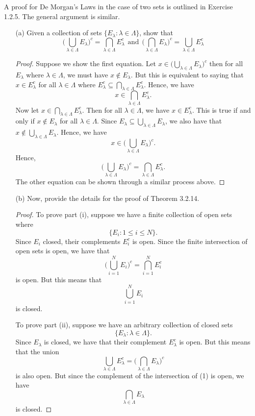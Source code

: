 A proof for De Morgan's Laws in the case of two sets is outlined in Exercise 1.2.5. The general argument is similar. 

\begin{enumerate}
    \item[(a)] Given a collection of sets \( \{ E_{\lambda} : \lambda \in \Lambda\}  \), show that \[ \Big( \bigcup_{ \lambda \in \Lambda } E_{\lambda}  \Big)^c = \bigcap_{ \lambda \in \Lambda } E_{\lambda}^c  ~~ \text{and} ~~ \Big( \bigcap_{ \lambda \in \Lambda } E_{\lambda}  \Big)^c = \bigcup_{ \lambda \in \Lambda } E_{\lambda}^c \]
        \begin{proof}
            Suppose we show the first equation. Let \( x \in \Big( \bigcup_{ \lambda \in \Lambda } E_{\lambda}  \Big)^c \) then for all \( E_{\lambda} \) where \( \lambda \in \Lambda \), we must have \( x \notin E_{\lambda} \). But this is equivalent to saying that \( x \in E_{\lambda}^c \) for all \( \lambda \in \Lambda \) where \( E_{\lambda}^c \subseteq \bigcap_{ \lambda \in \Lambda } E_{\lambda}^c  \). Hence, we have
            \[  x \in \bigcap_{ \lambda \in \Lambda } E_{\lambda}^c.\]
            Now let \( x \in \bigcap_{ \lambda \in \Lambda } E_{\lambda}^c  \). Then for all \( \lambda \in \Lambda \), we have \( x \in E_{\lambda}^c \). This is true if and only if \( x \notin E_{\lambda} \) for all \( \lambda \in \Lambda \). Since \( E_{\lambda} \subseteq \bigcup_{ \lambda \in \Lambda } E_{\lambda} \), we also have that \( x \notin \bigcup_{ \lambda \in \Lambda } E_{\lambda}  \). Hence, we have 
            \[  x \in \Big( \bigcup_{ \lambda \in \Lambda } E_{\lambda}  \Big)^c. \]
            Hence, 
            \[ \Big( \bigcup_{ \lambda \in \Lambda } E_{\lambda}  \Big)^c = \bigcap_{ \lambda \in \Lambda } E_{\lambda}^c.\]
            The other equation can be shown through a similar process above.
        \end{proof}
    \item[(b)] Now, provide the details for the proof of Theorem 3.2.14.
        \begin{proof} 
    To prove part (i), suppose we have a finite collection of open sets where 
    \[ \{ E_{i} : 1 \leq  i \leq N \}.   \]
    Since \( E_i  \) closed, their complements \( E_i^c \) is open. Since the finite intersection of open sets is open, we have that 
    \[\Big(  \bigcup_{ i=1 }^{ N } E_{i} \Big)^c = \bigcap_{ i=1 }^{ N  } E_{i}^c  \]
    is open. But this means that 
    \[ \bigcup_{i=1}^{N} E_{i} \]
    is closed. 

    To prove part (ii), suppose we have an arbitrary collection of closed sets 
    \[ \{ E_\lambda : \lambda \in \Lambda \}.  \]
    Since \(E_{\lambda}\) is closed, we have that their complement \( E_{\lambda}^c \) is open. But this means that the union 
    \[ \bigcup_{\lambda \in \Lambda} E_{\lambda}^c = \Big( \bigcap_{ \lambda \in \Lambda } E_{\lambda}  \Big)^c \tag{1} \]
    is also open. But since the complement of the intersection of (1) is open, we have 
    \[ \bigcap_{ \lambda \in \Lambda } E_{\lambda}  \]
    is closed. 
        \end{proof}
\end{enumerate}



